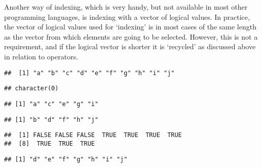 \documentclass[paper=a4,headsepline,BCOR=12mm,twoside,open=right,%
titlepage,headings=small,fontsize=10pt,index=totoc,bibliography=totoc,%
captions=tableheading,captions=nooneline]{scrbook}\usepackage{knitr}
\begin{document}
Another way of indexing, which is very handy, but not available in most other programming languages, is indexing with a vector of logical values. In practice, the vector of logical values used for `indexing' is in most cases of the same length as the vector from which elements are going to be selected. However, this is not a requirement, and if the logical vector is shorter it is `recycled' as discussed above in relation to operators.

\begin{knitrout}\footnotesize
{}\color{fgcolor}\begin{kframe}
\begin{alltt}
\hlstd{a[}\hlstd{]}
\end{alltt}
\begin{verbatim}
##  [1] "a" "b" "c" "d" "e" "f" "g" "h" "i" "j"
\end{verbatim}
\begin{alltt}
\hlstd{a[}\hlstd{]}
\end{alltt}
\begin{verbatim}
## character(0)
\end{verbatim}
\begin{alltt}
\hlstd{a[}\hlstd{(}\hlstd{,} \hlstd{)]}
\end{alltt}
\begin{verbatim}
## [1] "a" "c" "e" "g" "i"
\end{verbatim}
\begin{alltt}
\hlstd{a[}\hlstd{(}\hlstd{,} \hlstd{)]}
\end{alltt}
\begin{verbatim}
## [1] "b" "d" "f" "h" "j"
\end{verbatim}
\begin{alltt}
 \hlopt{>} 
\end{alltt}
\begin{verbatim}
##  [1] FALSE FALSE FALSE  TRUE  TRUE  TRUE  TRUE
##  [8]  TRUE  TRUE  TRUE
\end{verbatim}
\begin{alltt}
\hlstd{a[a} \hlopt{>} \hlstd{]}
\end{alltt}
\begin{verbatim}
## [1] "d" "e" "f" "g" "h" "i" "j"
\end{verbatim}
\begin{alltt}
 \hlkwb{<-}  \hlopt{>} 

\end{alltt}
\end{kframe}
\end{knitrout}
\end{document}
